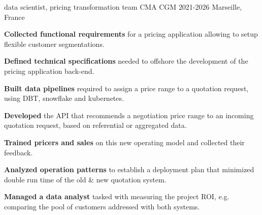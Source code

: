 
\begin{cventries}
  \cventry
  {data scientist, pricing transformation team} %
  {CMA CGM} %
  {2021-2026} %
  {Marseille, France} %
    {
      \begin{cvitems} %
      \item {\textbf{Collected functional requirements} for a pricing application allowing to setup flexible customer segmentations.}
      \item{\textbf{Defined technical specifications} needed to offshore the development of the pricing application back-end.}
      \item{\textbf{Built data pipelines} required to assign a price range to a quotation request, using DBT, snowflake and kubernetes.}
      \item{\textbf{Developed} the API that recommends a negotiation price range to an incoming quotation request, based on referential or aggregated data.}
      \item{\textbf{Trained pricers and sales} on this new operating model and collected their feedback.}
      \item{\textbf{Analyzed operation patterns} to establish a deployment plan that minimized double run time of the old \& new quotation system.}
      \item{\textbf{Managed a data analyst} tasked with measuring the project ROI, e.g. comparing the pool of customers addressed with both systems.}
      \end{cvitems}
    }


\end{cventries}
